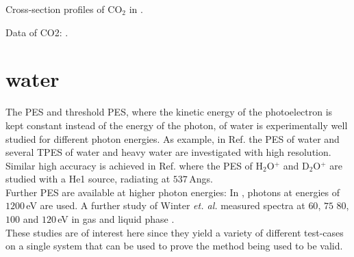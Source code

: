 Cross-section profiles of CO$_2$ in \cite{stieltje}.

Data of CO2: \cite{DiffLinear}.

\section{water}
The PES and threshold PES, where the kinetic energy of the photoelectron is kept constant instead of the energy of the photon, of water is experimentally well studied 
for different photon energies.
As example, in Ref. \cite{waterTPE} the PES of water and several TPES of water and heavy water are investigated with high resolution.\\
Similar high accuracy is achieved in Ref. \cite{waterHePES} where the PES of H$_2$O$^+$ and D$_2$O$^+$ are studied with a He1 source, radiating at $537\,$Angs.\\
Further PES are available at higher photon energies:
In \cite{water1200}, photons at energies of $1200\,$eV are used.
A further study of Winter \textit{et. al.} measured spectra at $60$, $75$ $80$, $100$ and $120\,$eV in gas and liquid phase \cite{winterWater}.\\
These studies are of interest here since they yield a variety of different test-cases on a single system that can be used to prove the method being used to be valid.
